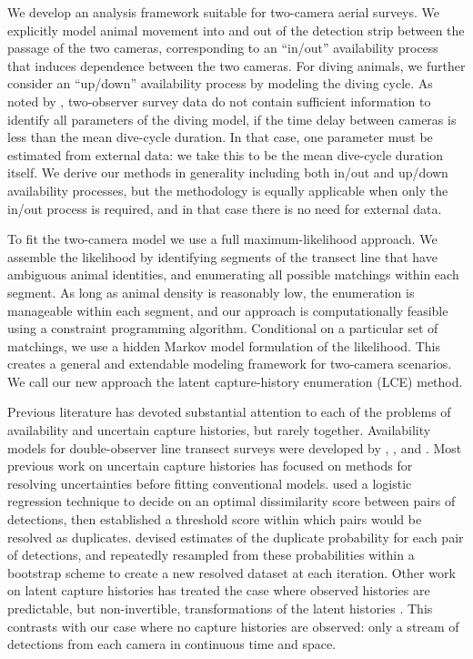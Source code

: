 \documentclass[useAMS, usenatbib, referee]{biom}\usepackage[]{graphicx}\usepackage[]{color}
\begin{document}
We develop an analysis framework suitable for two-camera aerial surveys. We explicitly model animal movement into and out of the detection strip between the passage of the two cameras, corresponding to an ``in/out'' availability process that induces dependence between the two cameras. For diving animals, we further consider an ``up/down'' availability process by modeling the diving cycle. As noted by \cite{Stevenson+al:18}, two-observer survey data do not contain sufficient information to identify all parameters of the diving model, if the time delay between cameras is less than the mean dive-cycle duration. In that case, one parameter must be estimated from external data: we take this to be the mean dive-cycle duration itself. We derive our methods in generality including both in/out and up/down availability processes, but the methodology is equally applicable when only the in/out process is required, and in that case there is no need for external data.

To fit the two-camera model we use a full maximum-likelihood approach. We assemble the likelihood by identifying segments of the transect line that have ambiguous animal identities, and enumerating all possible matchings within each segment. As long as animal density is reasonably low, the enumeration is manageable within each segment, and our approach is computationally feasible using a constraint programming algorithm. Conditional on a particular set of matchings, we use a hidden Markov model formulation of the likelihood. This creates a general and extendable modeling framework for two-camera scenarios. We call our new approach the latent capture-history enumeration (LCE) method.


Previous literature has devoted substantial attention to each of the problems of availability and uncertain capture histories, but rarely together. Availability models for double-observer line transect surveys were developed by \cite{Borchers+al:13}, \cite{Langrock+al:13}, and \cite{Borchers+Langrock:15}. Most previous work on uncertain capture histories has focused on methods for resolving uncertainties before fitting conventional models. \cite{Pike+DoniolValcroze:15} used a logistic regression technique to decide on an optimal dissimilarity score between pairs of detections, then established a threshold score within which pairs would be resolved as duplicates. \cite{Hamilton+al:18} devised estimates of the duplicate probability for each pair of detections, and repeatedly resampled from these probabilities within a bootstrap scheme to create a new resolved dataset at each iteration. Other work on latent capture histories has treated the case where observed histories are predictable, but non-invertible, transformations of the latent histories \citep[e.g.][]{Zhang+al:19,Bonner+Holmberg:13,Link+al:10}. This contrasts with our case where no capture histories are observed: only a stream of detections from each camera in continuous time and space.
\end{document}
